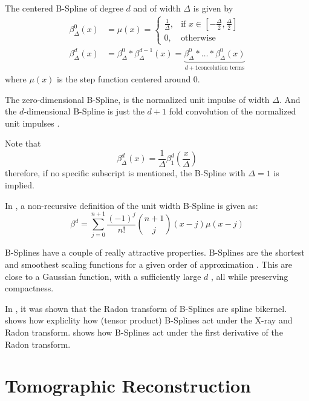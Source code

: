 \begin{definition}
	\label{def:bspline}
	The centered B-Spline of degree $d$ and of width $\Delta$ is given by
	\begin{align*}
		\beta_\Delta^0(x) & = \mu(x) =
		\begin{cases}
			\frac{1}{\Delta}, & \text{if } x \in [-\frac{\Delta}{2}, \frac{\Delta}{2}] \\
			0,                & \text{otherwise}
		\end{cases} \\
		\beta_\Delta^d(x) & = \beta_\Delta^0 * \beta_\Delta^{d-1}(x) =
		\underbrace{\beta_\Delta^0 * \dots * \beta_\Delta^0(x)}_{d+1 \text{concolution terms}}
	\end{align*}
	where $\mu(x)$ is the step function centered around 0. 

	The zero-dimensional B-Spline, is the normalized unit impulse of width $\Delta$. And the
	$d$-dimensional B-Spline is just the $d+1$ fold convolution of the normalized unit impulses
	\cite{horbelt_discretization_2002}.

	Note that
	\[ \beta_\Delta^d(x) = \frac{1}{\Delta} \beta_1^d(\frac{x}{\Delta}) \]
	therefore, if no specific subscript is mentioned, the B-Spline with $\Delta = 1$ is implied.

	In \cite{unser_fast_1991}, a non-recursive definition of the unit width B-Spline is given as:
	\[ \beta^d = \sum_{j=0}^{n+1} \frac{(-1)^j}{n!} \binom{n+1}{j}(x - j)\mu(x - j) \]
\end{definition}

B-Splines have a couple of really attractive properties. B-Splines are the shortest and smoothest
scaling functions for a given order of approximation \cite{momey_b-spline_2012}. This
are close to a Gaussian function,
with a sufficiently large $d$ \cite{momey_b-spline_2012}, all while preserving compactness.

In \cite{horbelt_discretization_2002}, it was shown that the Radon transform of B-Splines are spline
bikernel. \cite{entezari_box_2012} shows how expliclity how (tensor product) B-Splines act under
the X-ray and Radon transform. \cite{nilchian_differential_2012} shows how B-Splines act under
the first derivative of the Radon transform.

\chapter{Tomographic Reconstruction}

